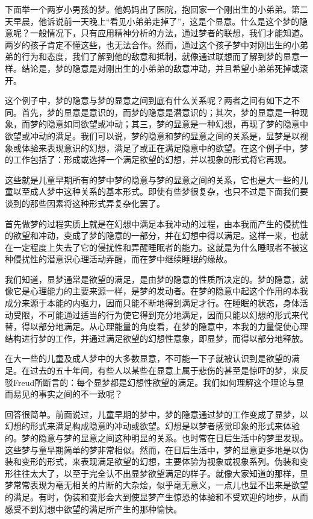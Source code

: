 \documentclass[UTF8,10pt,a4paper,openany]{book}
\begin{document}
下面举一个两岁小男孩的梦。他妈妈出了医院，抱回家一个刚出生的小弟弟。第二天早晨，他诉说前一天晚上“看见小弟弟走掉了”，这是个显意。什么是这个梦的隐意呢？一般情况下，只有应用精神分析的方法，通过梦者的联想，我们才能知道。两岁的孩子肯定不懂这些，也无法合作。然而，通过这个孩子梦中对刚出生的小弟弟的行为和态度，我们了解到他的敌意和抵制，就像通过联想而了解到梦的显意一样。结论是，梦的隐意是对刚出生的小弟弟的敌意冲动，并且希望小弟弟死掉或滚开。

这个例子中，梦的隐意与梦的显意之间到底有什么关系呢？两者之间有如下之不同。首先，梦的显意是意识的，而梦的隐意是潜意识的；其次，梦的显意是一种现象，而梦的隐意如同欲望或冲动；其三，梦的显意是一种幻想，再现了梦的隐意中欲望或冲动的满足。我们可以说，梦的隐意和梦的显意之间的关系是，显梦是以视象或体验来表现意识的幻想，满足了或正在满足隐意中的欲望。在这个例子中，梦的工作包括了：形成或选择一个满足欲望的幻想，并以视象的形式将它再现。

这些就是儿童早期所有的梦中梦的隐意与梦的显意之间的关系，它也是大一些的儿童以至成人梦中这种关系的基本形式。即使有些梦很复杂，也只不过是下面我们要谈到的那些因素将这种形式弄复杂化罢了。

首先做梦的过程实质上就是在幻想中满足本我冲动的过程，由本我而产生的侵扰性的欲望和冲动，变成了梦的隐意的一部分，并在幻想中得以满足。这样一来，也就在一定程度上失去了它的侵扰性和弄醒睡眠者的能力。这就是为什么睡眠者不被这种侵扰性的潜意识心理活动弄醒，而在梦中继续睡眠的缘故。

我们知道，显梦通常是欲望的满足，是由梦的隐意的性质所决定的。梦的隐意，就像它是心理能力的主要来源一样，是梦的发动者。在梦的隐意中起这个作用的本我成分来源于本能的内驱力，因而只能不断地得到满足才行。在睡眠的状态，身体活动受限，不可能通过适当的行为使它得到充分地满足，因而只能以幻想的形式来代替，得以部分地满足。从心理能量的角度看，在梦的隐意中，本我的力量促使心理结构进行梦的工作，并通过满足欲望的幻想性意象，即显梦，而得以部分地释放。

在大一些的儿童及成人梦中的大多数显意，不可能一下子就被认识到是欲望的满足。在过去的五十年间，有些人以某些在显意上属于悲伤的甚至是惊吓的梦，来反驳Freud所断言的：每个显梦都是幻想性欲望的满足。我们如何理解这个理论与显而易见的事实之间的不一致呢？

回答很简单。前面说过，儿童早期的梦中，梦的隐意通过梦的工作变成了显梦，以幻想的形式来满足构成隐意旳冲动或欲望。幻想是以梦者感觉印象的形式来体验的。梦的隐意与梦的显意之间这种明显的关系。也时常在日后生活中的梦里发现。这些梦与童早期简单的梦非常相似。然而，在日后生活中，梦的显意更多地是以伪装和变形的形式，来表现满足欲望的幻想，主要体验为视象或视象系列。伪装和变形往往太大了，以至于完全认不出显梦欲望满足的样子。就像大家知道的那样，显梦常常表现为亳无相关的片断的大杂烩，似乎毫无意义，一点儿也显不出来是欲望的满足。有时，伪装和变形会大到使显梦产生惊恐的体验和不受欢迎的地步，从而感受不到幻想中欲望的满足所产生的那种愉快。
\end{document}
